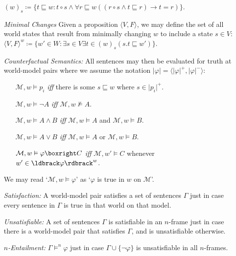 \documentclass[a4paper, 11pt]{article} %
\newcommand{\tuple}[1]{\langle#1\rangle} %
\newcommand{\set}[1]{\lbrace#1\rbrace} %
\newcommand{\M}[0]{\mathcal{M}}
\renewcommand{\Vert}[1]{\ldbrack#1\rdbrack}
\renewcommand{\vert}[1]{\lvert#1\rvert}
\begin{document}
\begin{enumerate}
    $(w)_s\coloneq \set{t\sqsubseteq w:t\circ s \wedge \forall r\sqsubseteq w((r\circ s \wedge t \sqsubseteq r) \rightarrow t = r)}$.
  \item[\it Minimal Changes] Given a proposition $\tuple{V,F}$, we may define the set of all world states that result from minimally changing $w$ to include a state $s\in V$:\\ 
      $\tuple{V,F}^w\coloneq \set{w'\in W:\exists s\in V\exists t\in(w)_s(s.t\sqsubseteq w')}$.
  \item[\it Counterfactual Semantics:] All sentences may then be evaluated for truth at world-model pairs where we assume the notation $\vert{\varphi}=\tuple{\vert{\varphi}^+,\vert{\varphi}^-}$:
    \begin{itemize}
      \item[] $\M, w \vDash p_i$ \textit{iff} there is some $s \sqsubseteq w$ where $s \in \vert{p_i}^+$.
      \item[] $\M, w \vDash \neg A$ \textit{iff} $\M, w \nvDash A$.
      \item[] $\M, w \vDash A \wedge B$ \textit{iff} $\M, w \vDash A$ and $\M, w \vDash B$.
      \item[] $\M, w \vDash A \vee B$ \textit{iff} $\M, w \vDash A$ or $\M, w \vDash B$.
      \item[] $\M, w \vDash \varphi\boxright C$ \textit{iff} $\M, w' \vDash C$ whenever $w'\in\Vert{\varphi}^w$.
    \end{itemize}
    We may read `$\M, w \vDash \varphi$' as `$\varphi$ is true in $w$ on $\M$'.
  \item[\it Satisfaction:] A world-model pair satisfies a set of sentences $\Gamma$ just in case every sentence in $\Gamma$ is true in that world on that model.
  \item[\it Unsatisfiable:] A set of sentences $\Gamma$ is satisfiable in an $n$-frame just in case there is a world-model pair that satisfies $\Gamma$, and is unsatisfiable otherwise.
  \item[\it $n$-Entailment:] $\Gamma \vDash^n \varphi$ just in case $\Gamma\cup\set{\neg\varphi}$ is unsatisfiable in all $n$-frames. 
\end{enumerate}
\end{document}
